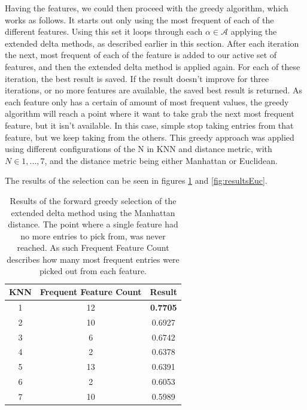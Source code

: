 Having the features, we could then proceed with the greedy algorithm, which
works as follows. It starts out only using the most frequent of each of
the different features. Using this set it loops through each $\alpha \in
\mathcal{A}$ applying the extended delta methods, as described earlier in this
section. After each iteration the next, most frequent of each of the feature
is added to our active set of features, and then the extended delta method is
applied again. For each of these iteration, the best result is saved. If the
result doesn't improve for three iterations, or no more features are available,
the saved best result is returned. As each feature only has a certain of amount
of most frequent values, the greedy algorithm will reach a point where it want
to take grab the next most frequent feature, but it isn't available. In this
case, simple stop taking entries from that feature, but we keep taking from the
others. This greedy approach was applied using different configurations of the
N in KNN and distance metric, with $N \in {1,...,7}$, and the distance metric
being either Manhattan or Euclidean.

The results of the selection can be seen in figures \ref{fig:resultsMan} and 
\ref{fig:resultsEuc}. 

\begin{table}
    \centering
    \begin{tabular}{|c|c|c|}
    \hline
    KNN & Frequent Feature Count & Result          \\ \hline
    1   & 12                     & \textbf{0.7705} \\ \hline
    2   & 10                     & 0.6927          \\ \hline
    3   & 6                      & 0.6742          \\ \hline
    4   & 2                      & 0.6378          \\ \hline
    5   & 13                     & 0.6391          \\ \hline
    6   & 2                      & 0.6053          \\ \hline
    7   & 10                     & 0.5989          \\ \hline
    \end{tabular}
    \caption{Results of the forward greedy selection of the extended delta
        method using the Manhattan distance. The point where a single feature
        had no more entries to pick from, was never reached. As such Frequent
        Feature Count describes how many most frequent entries were picked out
        from each feature.}
    \label{fig:resultsMan}
\end{table}

